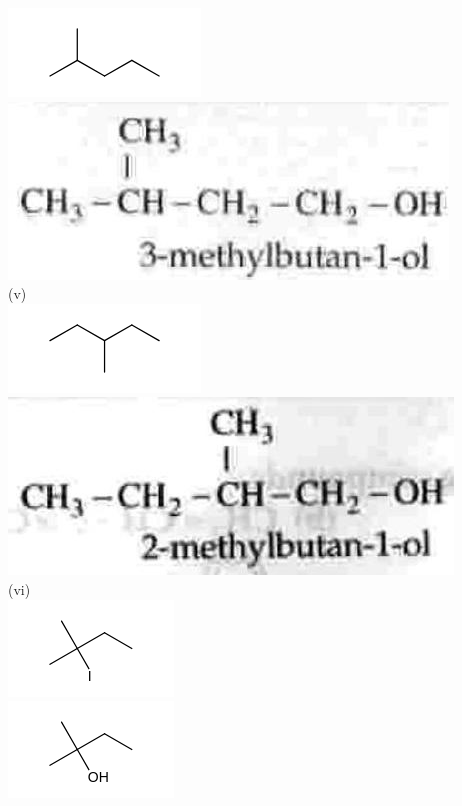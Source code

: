 \documentclass[10pt]{article}
\begin{document}
\includegraphics{smile-7f4dc545fe835558b2b8965bc8b9274c42b9f15b}\\
\includegraphics[max width=\textwidth, center]{2025_01_28_8470952b98110cec3aabg-218(2)}\\
(v)\\
\includegraphics{smile-0810a26ffe1876d1f8c73f03ed81bbe3caf21e88}\\
\includegraphics[max width=\textwidth, center]{2025_01_28_8470952b98110cec3aabg-219(1)}\\
(vi)\\
\includegraphics{smile-d11dcbdd80273cde4e81b7e1cd1d0527b88295ce}\\
\includegraphics{smile-2b02a1fba5247ae4144659a3ee92f54b11d221d9}
\end{document}
